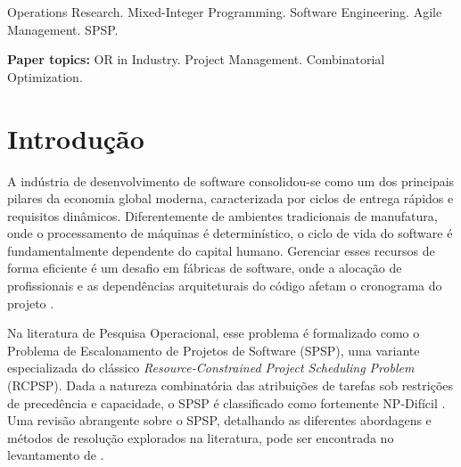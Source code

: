 \documentclass[a4paper,11pt]{article}
\begin{document}
\begin{abstract}
    The management of development activities in software projects can be a complex
    tactical challenge, where the allocation of tasks to human resources can become
    a bottleneck. Task allocation in software projects is traditionally modeled
    considering only technical constraints. This paper proposes a Mixed-Integer
    Linear Programming (MILP) model for the Software Project Scheduling Problem (SPSP)
    that incorporates behavioral compatibility. The formulation penalizes misalignment
    through a cubic polynomial function of Solides profiles, allied with a technical
    bonus. Solving 1380 instances in the Gurobi Optimizer demonstrates that cognitive
    noise increases the makespan and mathematically validates Brooks's Law, providing
    a relevant metric for the project’s tactical planning.
\end{abstract}

\begin{keywords}
Operations Research. Mixed-Integer Programming. Software Engineering. 
Agile Management. SPSP.

\vspace{0.3cm}
\noindent \textbf{Paper topics:} OR in Industry. Project Management.
Combinatorial Optimization.
\end{keywords}

\newpage
{}

\section{Introdução} 

A indústria de desenvolvimento de software consolidou-se como um dos principais 
pilares da economia global moderna, caracterizada por ciclos de entrega rápidos 
e requisitos dinâmicos. Diferentemente de ambientes tradicionais de manufatura, 
onde o processamento de máquinas é determinístico, o ciclo de vida do software 
é fundamentalmente dependente do capital humano. Gerenciar esses recursos de forma 
eficiente é um desafio em fábricas de software, onde a alocação de profissionais 
e as dependências arquiteturais do código afetam o cronograma do projeto 
\citep{dikert2016, faria2022}.

Na literatura de Pesquisa Operacional, esse problema é formalizado como o 
Problema de Escalonamento de Projetos de Software (SPSP), uma variante 
especializada do clássico \textit{Resource-Constrained Project Scheduling Problem} 
(RCPSP). Dada a natureza combinatória das atribuições de tarefas sob restrições 
de precedência e capacidade, o SPSP é classificado como fortemente NP-Difícil 
\citep{blazewicz1983, kolisch1999}. Uma revisão abrangente sobre o SPSP, detalhando 
as diferentes abordagens e métodos de resolução explorados na literatura, pode 
ser encontrada no levantamento de \citet{vegavelazquez2018}.
\end{document}
